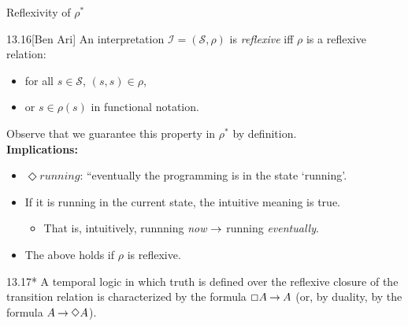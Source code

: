 \begin{wideslide}[bm=,toc=]{Reflexivity of $\rho^*$}
\begin{defn}{13.16}[Ben Ari]
An interpretation $\mathcal{I} = (\mathcal{S},\rho)$ is \emph{reflexive}
iff $\rho$ is a reflexive relation: 
\begin{itemize}
\item<2-> for all $s \in \mathcal{S}$, $(s,s) \in \rho$, 
\item<3-> or $s \in \rho(s)$ in functional notation.
\end{itemize}
\end{defn}
\pause[3]
\vspace{-3mm}
Observe that we guarantee this property in $\rho^*$ by definition.\\[2mm]
\pause
{\bf Implications:}
\begin{itemize}
\item<6-> $\Diamond running$: ``eventually the programming is in the state
`running'.
\item<7-> If it is running in the current state, the intuitive meaning is true.
\begin{itemize}
\item<8-> That is, intuitively, runnning \emph{now} $\mathbin{\rightarrow}$ running \emph{eventually}.
\end{itemize}
\item<9-> The above holds if $\rho$ is reflexive.
\end{itemize}
\pause[5]
\vspace{-2mm}
\begin{thm}{13.17*}
A temporal logic in which truth is defined over the reflexive closure of the transition relation 
is characterized by the formula $\Box A \mathbin{\rightarrow} A$ (or, by duality, by the formula $A \mathbin{\rightarrow} \Diamond A$).
\end{thm}
\end{wideslide}

